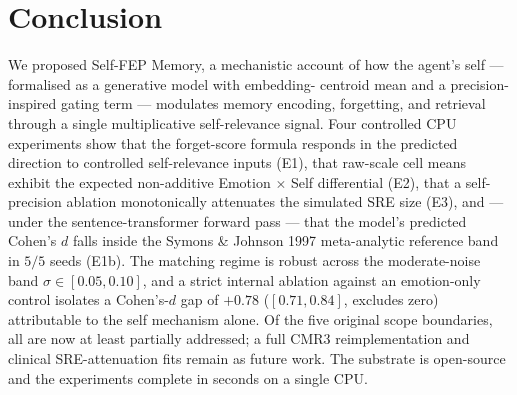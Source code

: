 \section{Conclusion}
\label{sec:conclusion}

We proposed Self-FEP Memory, a mechanistic account of how the
agent's self --- formalised as a generative model with embedding-
centroid mean and a precision-inspired gating term --- modulates memory
encoding, forgetting, and retrieval through a single multiplicative
self-relevance signal. Four controlled CPU experiments show that the
forget-score formula responds in the predicted direction to controlled
self-relevance inputs (E1), that raw-scale cell means exhibit the
expected non-additive Emotion $\times$ Self differential (E2), that a
self-precision ablation monotonically attenuates the simulated SRE
size (E3), and --- under the sentence-transformer forward pass ---
that the model's predicted Cohen's $d$ falls inside the Symons \&
Johnson 1997 meta-analytic reference band in $5/5$ seeds (E1b).
The matching regime is robust across the moderate-noise band
$\sigma \in [0.05, 0.10]$, and a strict internal ablation against an
emotion-only control isolates a Cohen's-$d$ gap of $+0.78$
($[0.71, 0.84]$, excludes zero) attributable to the self mechanism
alone. Of the five original scope boundaries, all are now at least
partially addressed; a full CMR3 reimplementation and clinical
SRE-attenuation fits remain as future work. The substrate is open-source and the experiments complete in
seconds on a single CPU.
